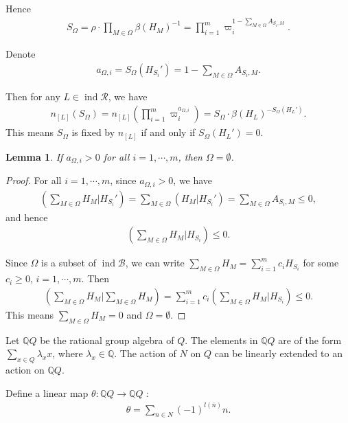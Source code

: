 \documentclass[12pt]{amsart}
\newtheorem{lemma}[theorem]{Lemma}
\begin{document}
Hence
\begin{align*}
    S_{\Omega} = \rho \cdot \prod_{M\in \Omega} \beta(H_M)^{-1} = \prod_{i=1}^m \varpi_i^{1-\sum_{M\in \Omega} A_{S_i,M}}.
\end{align*}

Denote 
\begin{align*}
    a_{\Omega,i} = S_{\Omega} (H_{S_i}') = 1-\sum_{M\in\Omega} A_{S_i,M}.
\end{align*}

Then for any $L\in \operatorname{ind}\mathcal{R}$, we have 
\begin{align*}
    n_{[L]}(S_{\Omega}) = n_{[L]}(\prod_{i=1}^m \varpi_i^{a_{\Omega,i}}) = S_{\Omega}\cdot \beta(H_L)^{-S_{\Omega}(H_{L}')}.
\end{align*}
This means $S_{\Omega}$ is fixed by $n_{[L]}$ if and only if $S_{\Omega}(H_L') = 0$.

\begin{lemma}\label{omega0}
    If $a_{\Omega,i} >0$ for all $i=1,\cdots,m$, then $\Omega = \emptyset$.
\end{lemma}

\begin{proof}
    For all $i=1,\cdots,m$, since $a_{\Omega,i}>0$, we have 
    \begin{align*}
        (\sum_{M\in\Omega} H_M|H_{S_i}') = \sum_{M\in\Omega} (H_M|H_{S_i}') = \sum_{M\in\Omega} A_{S_i,M} \leq 0, 
    \end{align*}
    and hence 
    \begin{align*}
        (\sum_{M\in\Omega} H_M|H_{S_i}) \leq 0.
    \end{align*}

    Since $\Omega$ is a subset of $\operatorname{ind}\mathcal{B}$, we can write $\sum_{M\in\Omega} H_M = \sum_{i=1}^m c_i H_{S_i}$ for some $c_i\geq 0$, $i=1,\cdots,m$.
    Then 
    \begin{align*}
        (\sum_{M\in\Omega} H_M|\sum_{M\in\Omega} H_M) = \sum_{i=1}^m c_i(\sum_{M\in\Omega}H_M|H_{S_i}) \leq 0.
    \end{align*} 
    This means $\sum_{M\in\Omega} H_M=0 $ and $\Omega = \emptyset$.
\end{proof}


Let $\mathbb{Q}Q$ be the rational group algebra of $Q$.
The elements in $\mathbb{Q}Q$ are of the form $\sum_{x\in Q} \lambda_x x$, where $\lambda_x\in \mathbb{Q}$.
The action of $N$ on $Q$ can be linearly extended to an action on $\mathbb{Q}Q$.

Define a linear map $\theta:\mathbb{Q}Q \rightarrow \mathbb{Q}Q$ :
\begin{align*}
    \theta = \sum_{n\in N} (-1)^{l(\overline{n})} n.
\end{align*}
\end{document}

